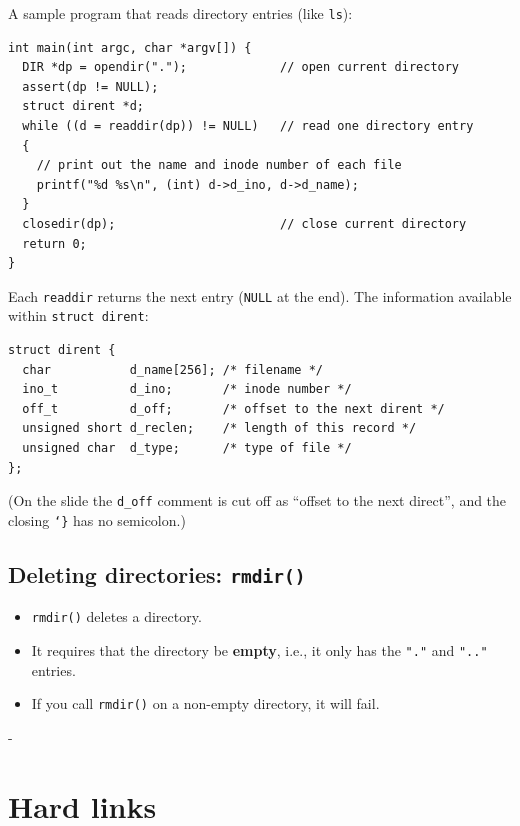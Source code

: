 \documentclass[11pt,a4paper]{article}
\makeatletter
\newcommand{\keepspace}[1]{\par\penalty-100\begingroup
  \setlength{\dimen@}{#1}\dimen@ii\pagegoal\advance\dimen@ii-\pagetotal
  \ifdim\dimen@>\dimen@ii\ifdim\dimen@ii>\z@\vfil\fi\break\fi\endgroup}
\makeatother
\begin{document}
A sample program that reads directory entries (like \texttt{ls}):

\begin{lstlisting}
int main(int argc, char *argv[]) {
  DIR *dp = opendir(".");             // open current directory
  assert(dp != NULL);
  struct dirent *d;
  while ((d = readdir(dp)) != NULL)   // read one directory entry
  {
    // print out the name and inode number of each file
    printf("%d %s\n", (int) d->d_ino, d->d_name);
  }
  closedir(dp);                       // close current directory
  return 0;
}
\end{lstlisting}

Each \texttt{readdir} returns the next entry (\texttt{NULL} at the end).
The information available within \texttt{struct dirent}:

\begin{lstlisting}
struct dirent {
  char           d_name[256]; /* filename */
  ino_t          d_ino;       /* inode number */
  off_t          d_off;       /* offset to the next dirent */
  unsigned short d_reclen;    /* length of this record */
  unsigned char  d_type;      /* type of file */
};
\end{lstlisting}
{\small (On the slide the \texttt{d\_off} comment is cut off as ``offset to
the next direct'', and the closing \texttt{\char`\}} has no semicolon.)}

\subsection{Deleting directories: \texttt{rmdir()}}

\begin{itemize}
  \item \texttt{rmdir()} deletes a directory.
  \item It requires that the directory be \textbf{empty}, i.e., it only has
        the \texttt{"."} and \texttt{".."} entries.
  \item If you call \texttt{rmdir()} on a non-empty directory, it will fail.
\end{itemize}

\keepspace{7\baselineskip}
\section{Hard links}\label{sec:hard}
\end{document}
